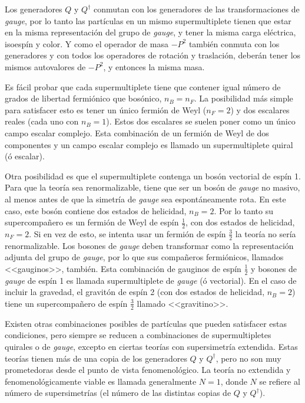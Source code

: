 Los generadores $Q$ y $Q^\dagger$ conmutan con los generadores de las
transformaciones de \emph{gauge}, por lo tanto las partículas en un mismo
supermultiplete tienen que estar en la misma representación del grupo de \emph{gauge},
y tener la misma carga eléctrica, isoespín y color. Y como el operador de masa
$-P^2$ también conmuta con los generadores y con todos los operadores de
rotación y traslación, deberán tener los mismos autovalores de $-P^2$, y
entonces la misma masa.

Es fácil probar que cada supermultiplete tiene que contener igual número de
grados de libertad fermiónico que bosónico, $n_B = n_F$. La posibilidad más
simple para satisfacer esto es tener un único fermión de Weyl ($n_F=2$) y dos
escalares reales (cada uno con $n_B=1$). Estos dos escalares se suelen poner
como un único campo escalar complejo. Esta combinación de un fermión de Weyl de
dos componentes y un campo escalar complejo es llamado un supermultiplete
quiral (ó escalar).

Otra posibilidad es que el supermultiplete contenga un bosón vectorial de espín
1. Para que la teoría sea renormalizable, tiene que ser un bosón de \emph{gauge} no
masivo, al menos antes de que la simetría de \emph{gauge} sea espontáneamente rota. En
este caso, este bosón contiene dos estados de helicidad, $n_B=2$. Por lo tanto
su supercompa\~nero es un fermión de Weyl de espín $\frac{1}{2}$, con dos estados de
helicidad, $n_F=2$. Si en vez de esto, se intenta usar un fermión de espín $\frac{3}{2}$
la teoría no sería renormalizable. Los bosones de \emph{gauge} deben transformar como
la representación adjunta del grupo de \emph{gauge}, por lo que sus compañeros
fermiónicos, llamados <<gauginos>>, también. Esta combinación de gauginos
de espín $\frac{1}{2}$ y bosones de \emph{gauge} de espín 1 es llamada supermultiplete de
\emph{gauge} (ó vectorial).
En el caso de incluir la gravedad, el gravitón de espín 2 (con dos estados de helicidad,
$n_B=2$) tiene un supercompañero de espín $\frac{3}{2}$ llamado <<gravitino>>.

Existen otras combinaciones posibles de partículas que pueden satisfacer estas
condiciones, pero siempre se reducen a combinaciones de supermultipletes
quirales o de \emph{gauge}, excepto en ciertas teorías con supersimetría extendida.
Estas teorías tienen más de una copia de los generadores $Q$ y $Q^\dagger$, pero no
son muy prometedoras desde el punto de vista fenomenológico. La teoría no
extendida y fenomenológicamente viable es llamada generalmente $N=1$, donde $N$
se refiere al número de supersimetrías (el número de las distintas copias de
$Q$ y $Q^\dagger$).


